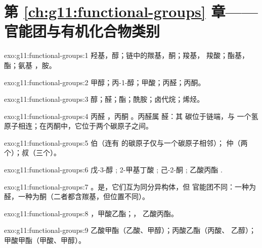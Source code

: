 \section*{第 \ref{ch:g11:functional-groups} 章——官能团与有机化合物类别}

\begin{solution}{exo:g11:functional-groups:1}
羟基，醇；链中的羰基，酮；羧基，
羧酸；酯基，酯；氨基 ，胺。
\end{solution}

\begin{solution}{exo:g11:functional-groups:2}
甲醇；丙-1-醇；甲酸；丙醛；丙酮。
\end{solution}

\begin{solution}{exo:g11:functional-groups:3}
醇；醛；酯；酰胺；卤代烷；烯烃。
\end{solution}

\begin{solution}{exo:g11:functional-groups:4}
丙醛 ，丙酮 。丙醛属
醛：其  碳位于链端，与
一个氢原子相连；在丙酮中，它位于两个碳原子之间。
\end{solution}

\begin{solution}{exo:g11:functional-groups:5}
伯（连有  的碳原子仅与一个碳原子相邻）；
仲（两个）；叔（三个）。
\end{solution}

\begin{solution}{exo:g11:functional-groups:6}
戊-3-醇 ;
2-甲基丁酸 ;
己-2-酮 ;
乙酸丙酯 .
\end{solution}

\begin{solution}{exo:g11:functional-groups:7}
。是，它们互为同分异构体，但
官能团不同：一种为醛，一种为酮（二者都含羰基，但位置不同）。
\end{solution}

\begin{solution}{exo:g11:functional-groups:8}
，甲酸乙酯；，
乙酸丙酯。
\end{solution}

\begin{solution}{exo:g11:functional-groups:9}
乙酸甲酯（乙酸、甲醇）；丙酸乙酯（丙酸、
乙醇）；甲酸甲酯（甲酸、甲醇）。
\end{solution}

